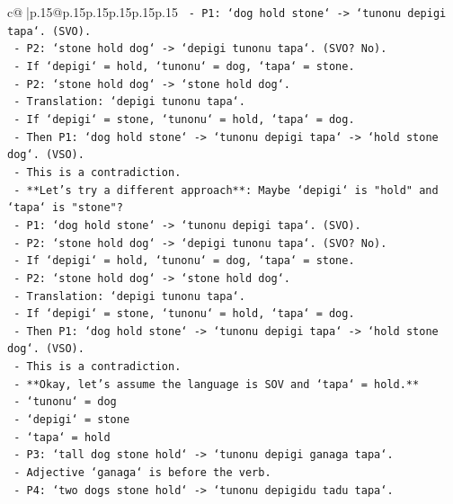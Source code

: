\documentclass{article}
\begin{document}
{\begin{supertabular}{c@{$\;$}|p{.15\linewidth}@{}p{.15\linewidth}p{.15\linewidth}p{.15\linewidth}p{.15\linewidth}p{.15\linewidth}}
{{{\texttt{         {-} P1: `dog hold stone` {-}> `tunonu depigi tapa`. (SVO).} \\
\texttt{         {-} P2: `stone hold dog` {-}> `depigi tunonu tapa`. (SVO? No).} \\
\texttt{         {-} If `depigi` = hold, `tunonu` = dog, `tapa` = stone.} \\
\texttt{         {-} P2: `stone hold dog` {-}> `stone hold dog`.} \\
\texttt{         {-} Translation: `depigi tunonu tapa`.} \\
\texttt{         {-} If `depigi` = stone, `tunonu` = hold, `tapa` = dog.} \\
\texttt{         {-} Then P1: `dog hold stone` {-}> `tunonu depigi tapa` {-}> `hold stone dog`. (VSO).} \\
\texttt{         {-} This is a contradiction.} \\
\texttt{     {-} **Let's try a different approach**: Maybe `depigi` is "hold" and `tapa` is "stone"?} \\
\texttt{       {-} P1: `dog hold stone` {-}> `tunonu depigi tapa`. (SVO).} \\
\texttt{       {-} P2: `stone hold dog` {-}> `depigi tunonu tapa`. (SVO? No).} \\
\texttt{       {-} If `depigi` = hold, `tunonu` = dog, `tapa` = stone.} \\
\texttt{       {-} P2: `stone hold dog` {-}> `stone hold dog`.} \\
\texttt{       {-} Translation: `depigi tunonu tapa`.} \\
\texttt{       {-} If `depigi` = stone, `tunonu` = hold, `tapa` = dog.} \\
\texttt{       {-} Then P1: `dog hold stone` {-}> `tunonu depigi tapa` {-}> `hold stone dog`. (VSO).} \\
\texttt{       {-} This is a contradiction.} \\
\texttt{     {-} **Okay, let's assume the language is SOV and `tapa` = hold.**} \\
\texttt{       {-} `tunonu` = dog} \\
\texttt{       {-} `depigi` = stone} \\
\texttt{       {-} `tapa` = hold} \\
\texttt{       {-} P3: `tall dog stone hold` {-}> `tunonu depigi ganaga tapa`.} \\
\texttt{         {-} Adjective `ganaga` is before the verb.} \\
\texttt{       {-} P4: `two dogs stone hold` {-}> `tunonu depigidu tadu tapa`.} \\
}}}
\end{supertabular}}
\end{document}
